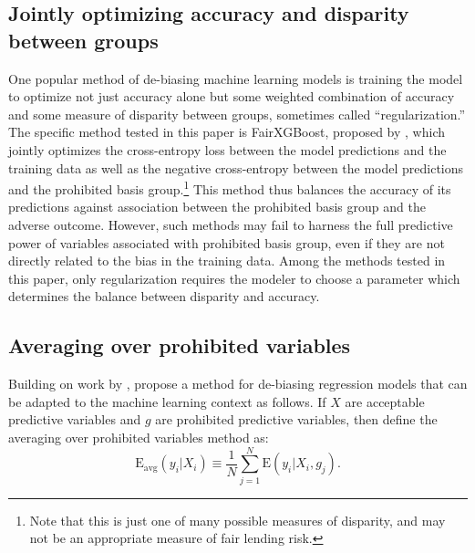 \subsection{Jointly optimizing accuracy and disparity between groups}\label{sec:regularization}
One popular method of de-biasing machine learning models is training the model to optimize not just accuracy alone but some weighted combination of accuracy and some measure of disparity between groups, sometimes called ``regularization.'' The specific method tested in this paper is FairXGBoost, proposed by , which jointly optimizes the cross-entropy loss between the model predictions and the training data as well as the negative cross-entropy between the model predictions and the prohibited basis group.\footnote{Note that this is just one of many possible measures of disparity, and may not be an appropriate measure of fair lending risk.} This method thus balances the accuracy of its predictions against association between the prohibited basis group and the adverse outcome. However, such methods may fail to harness the full predictive power of variables associated with prohibited basis group, even if they are not directly related to the bias in the training data. Among the methods tested in this paper, only regularization requires the modeler to choose a parameter which determines the balance between disparity and accuracy.

\subsection{Averaging over prohibited variables}\label{sec:popesydnor}

Building on work by ,  propose a method for de-biasing regression models that can be adapted to the machine learning context as follows. If $X$ are acceptable predictive variables and $g$ are prohibited predictive variables, then define the averaging over prohibited variables method as:
\begin{equation}\label{eq:popesydnor}
	\text{E}_{\text{avg}}\left(y_i\vert X_i\right) \equiv \frac{1}{N}\sum_{j = 1}^N \text{E}\left(y_i\vert X_i,g_j\right).
\end{equation}

